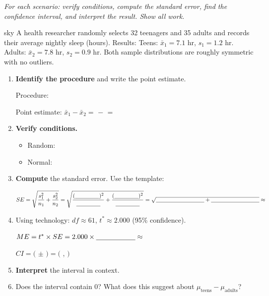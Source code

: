 \documentclass[10pt]{article}
\begin{document}
\namepartnerperiod

\vspace{0.15in}

\textit{For each scenario: verify conditions, compute the standard error, find the confidence
interval, and interpret the result. Show all work.}

\begin{scenariobox}{sky}
A health researcher randomly selects 32 teenagers and 35 adults and records their average
nightly sleep (hours). Results:
Teens: $\bar x_1 = 7.1$ hr, $s_1 = 1.2$ hr. \quad
Adults: $\bar x_2 = 7.8$ hr, $s_2 = 0.9$ hr.
Both sample distributions are roughly symmetric with no outliers.

\begin{enumerate}[label=\alph*.]
  \item \textbf{Identify the procedure} and write the point estimate.

        Procedure: \blank{8cm}

        Point estimate: $\bar x_1 - \bar x_2 = $ \blank{2cm} $-$ \blank{2cm} $=$ \blank{2.5cm}

  \item \textbf{Verify conditions.}
        \begin{itemize}
          \item Random: \writeline
          \item Normal: \writeline
        \end{itemize}

  \item \textbf{Compute} the standard error. Use the template:

        $SE = \sqrt{\dfrac{s_1^2}{n_1} + \dfrac{s_2^2}{n_2}}
            = \sqrt{\dfrac{(\blank{1.5cm})^2}{\blank{1.5cm}} + \dfrac{(\blank{1.5cm})^2}{\blank{1.5cm}}}
            = \sqrt{\blank{3cm} + \blank{3cm}} \approx$ \blank{2cm}

  \item Using technology: $df \approx 61$, $t^* \approx 2.000$ (95\% confidence).

        $ME = t^* \times SE = 2.000 \times \blank{2cm} \approx$ \blank{2cm}

        $CI = ($ \blank{2cm} $\pm$ \blank{2cm} $) = ($ \blank{2.5cm} , \blank{2.5cm} $)$

  \item \textbf{Interpret} the interval in context.

  \item Does the interval contain 0? \blank{1.5cm} \quad
        What does this suggest about $\mu_{\text{teens}} - \mu_{\text{adults}}$? \writeline
\end{enumerate}
\end{scenariobox}
\end{document}
